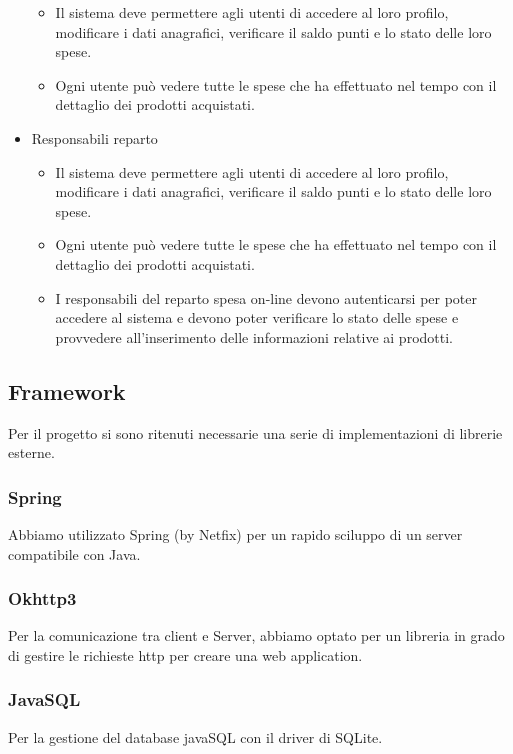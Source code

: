 \documentclass[12pt, a4paper]{article}
\begin{document}
\begin{itemize}
	\begin{itemize}
	\item  Il  sistema  deve  permettere  agli  utenti  di  accedere  al  loro  profilo,  modificare  i  dati  anagrafici, verificare il saldo punti e lo stato delle loro spese.
	\item Ogni utente può vedere tutte le spese che ha effettuato nel tempo con il dettaglio dei prodotti acquistati.
	\end{itemize}
\item Responsabili reparto
	\begin{itemize}
	\item  Il  sistema  deve  permettere  agli  utenti  di  accedere  al  loro  profilo,  modificare  i  dati  anagrafici, verificare il saldo punti e lo stato delle loro spese.
	\item Ogni utente può vedere tutte le spese che ha effettuato nel tempo con il dettaglio dei prodotti acquistati.
	\item I responsabili del reparto spesa on-line devono autenticarsi per poter accedere al sistema e devono poter  verificare  lo  stato delle  spese  e  provvedere  all’inserimento delle  informazioni  relative  ai prodotti.
	\end{itemize}
\end{itemize}
	

\subsection{Framework}
Per il progetto si sono ritenuti necessarie una serie di implementazioni di librerie esterne.
\subsubsection{Spring}
Abbiamo utilizzato Spring (by Netfix) per un rapido sciluppo di un server compatibile con Java.
\subsubsection{Okhttp3}
Per la comunicazione tra client e Server, abbiamo optato per un libreria in grado di gestire le richieste http per creare una web application.
\subsubsection{JavaSQL}
Per la gestione del database javaSQL con il driver di SQLite.
\end{document}
